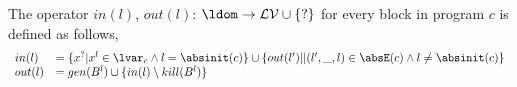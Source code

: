 The operator  $in(l)$, $out(l)$: $ \ldom \to \mathcal{LV} \cup \{?\}$ for every block in program $c$ is defined as follows,
 \[
 \begin{array}{ll}
    in(l)  & = \{ x^{?} | x^l \in \lvar_c \land  l = \absinit(c) \}  
    \cup \{ out(l')|  | (l',\_, l) \in \absE(c) \land  l \neq \absinit(c)\}  \\
     out(l)  & =  gen(B^{l}) \cup \{ in(l) \setminus kill(B^l)  \}  
 \end{array}
 \]
